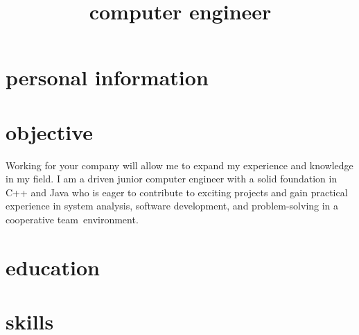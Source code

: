 \documentclass{moderncv}
\title{computer engineer}
\begin{document}
	\makecvtitle
	\section{personal information}
	\section{objective}
Working for your company will allow me to expand my experience and knowledge in my field. I am a driven junior computer engineer with a solid foundation in C++ and Java who is eager to contribute to exciting projects and gain practical experience in system analysis, software development, and problem-solving in a cooperative team environment.
	\section{education}
	\section{skills}
	 
\end{document}
